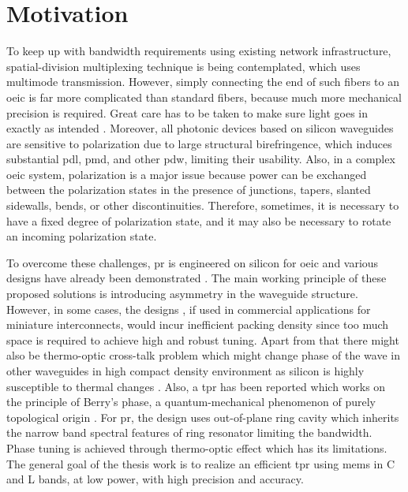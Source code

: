 \documentclass[../report.tex]{subfiles}
\begin{document}
	\section{Motivation} 
To keep up with bandwidth requirements using existing network infrastructure, spatial-division multiplexing technique \cite{space_richardson_2013} is being contemplated, which uses multimode transmission. However, simply connecting the end of such fibers to an \gls{oeic} is far more complicated than standard fibers, because much more mechanical precision is required. Great care has to be taken to make sure light goes in exactly as intended \cite{hecht_is_2016}. Moreover, all photonic devices based on silicon waveguides are sensitive to polarization due to large structural birefringence, which induces substantial \gls{pdl}, \gls{pmd}, and other \gls{pdw}, limiting their usability. Also, in a complex \gls{oeic} system, polarization is a major issue because power can be exchanged between the polarization states in the presence of junctions, tapers, slanted sidewalls, bends, or other discontinuities. Therefore, sometimes, it is necessary to have a fixed degree of polarization state, and it may also be necessary to rotate an incoming polarization state. \par

To overcome these challenges, \gls{pr} is engineered on silicon for \gls{oeic} and various designs have already been demonstrated \cite{xie_efficient_2015,velasco_ultracompact_2012,leung_numerical_2011,wang_design_2014,dai_novel_2011,wirth_efficient_2012,chen_compact_2011}. The main working principle of these proposed solutions is introducing asymmetry in the waveguide structure. However, in some cases, the designs \cite{sarmiento-merenguel_demonstration_2015}, if used in commercial applications for miniature interconnects, would incur inefficient packing density since too much space is required to achieve high and robust tuning. Apart from that there might also be thermo-optic cross-talk problem which might change phase of the wave in other waveguides in high compact density environment as silicon is highly susceptible to thermal changes \cite{ibrahim_athermal_2012}. Also, a \gls{tpr} has been reported which works on the principle of Berry’s phase, a quantum-mechanical phenomenon of purely topological origin \cite{xu_electrically_2014}. For \gls{pr}, the design uses out-of-plane ring cavity which inherits the narrow band spectral features of ring resonator limiting the bandwidth. Phase tuning is achieved through thermo-optic effect which has its limitations. The general goal of the thesis work is to realize an efficient \gls{tpr} using \gls{mems} in C and L bands, at low power, with high precision and accuracy.    
\end{document}
